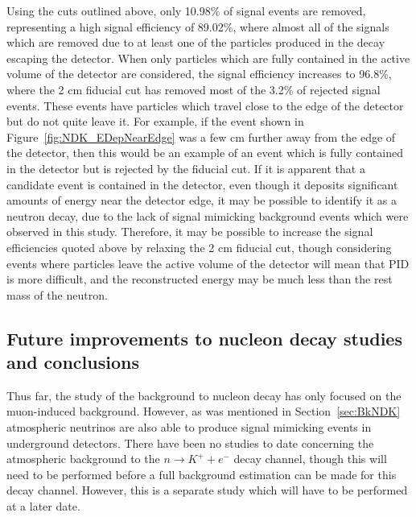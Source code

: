 Using the cuts outlined above, only 10.98\% of signal events are removed, representing a high signal efficiency of 89.02\%, where almost all of the signals which are removed due to at least one of the particles produced in the decay escaping the detector. When only particles which are fully contained in the active volume of the detector are considered, the signal efficiency increases to 96.8\%, where the 2 cm fiducial cut has removed most of the 3.2\% of rejected signal events. These events have particles which travel close to the edge of the detector but do not quite leave it. For example, if the event shown in Figure~\ref{fig:NDK_EDepNearEdge} was a few cm further away from the edge of the detector, then this would be an example of an event which is fully contained in the detector but is rejected by the fiducial cut. If it is apparent that a candidate event is contained in the detector, even though it deposits significant amounts of energy near the detector edge, it may be possible to identify it as a neutron decay, due to the lack of signal mimicking background events which were observed in this study. Therefore, it may be possible to increase the signal efficiencies quoted above by relaxing the 2 cm fiducial cut, though considering events where particles leave the active volume of the detector will mean that PID is more difficult, and the reconstructed energy may be much less than the rest mass of the neutron. \\ 

\subsection{Future improvements to nucleon decay studies and conclusions} \label{sec:NDKImprov}
Thus far, the study of the background to nucleon decay has only focused on the muon-induced background. However, as was mentioned in Section~\ref{sec:BkNDK} atmospheric neutrinos are also able to produce signal mimicking events in underground detectors. There have been no studies to date concerning the atmospheric background to the $n \rightarrow K^{+} + e^{-}$ decay channel, though this will need to be performed before a full background estimation can be made for this decay channel. However, this is a separate study which will have to be performed at a later date. \\

